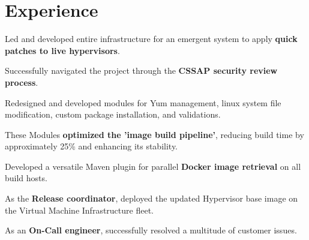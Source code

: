 \documentclass[]{resume-openfont}
\begin{document}
\begin{minipage}[t]{0.66\textwidth} 


\section{Experience}
\vspace{\topsep} %
\begin{tightemize}
\item Led and developed entire infrastructure for an emergent system to apply \textbf{quick patches to live hypervisors}.
\item Successfully navigated the project through the \textbf{CSSAP security review process}.
\item Redesigned and developed modules for Yum management, linux system file modification, custom package installation, and validations.
\item These Modules \textbf{optimized the 'image build pipeline'}, reducing build time by approximately 25\% and enhancing its stability.
\item Developed a versatile Maven plugin for parallel \textbf{Docker image retrieval} on all build hosts.
\item As the \textbf{Release coordinator}, deployed the updated Hypervisor base image on the Virtual Machine Infrastructure fleet.
\item As an \textbf{On-Call engineer}, successfully resolved a multitude of customer issues.
\end{tightemize}
\sectionsep


\end{minipage}
\end{document}
